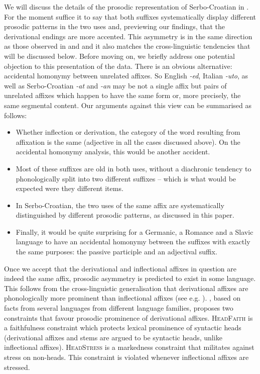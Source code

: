 \documentclass[output=paper]{langsci/langscibook}
\begin{document}
\noindent We will discuss the details of the prosodic representation of Serbo-Croatian in  . For the moment suffice it to say that both suffixes systematically display different prosodic patterns in the two uses and, previewing our findings, that the derivational endings are more accented. This asymmetry is in the same direction as those observed in \citet{Mar2002} and \citet{Arsim2013} and it also matches the cross-linguistic tendencies that will be discussed below.
Before moving on, we briefly address one potential objection to this presentation of the data. There is an obvious alternative: accidental homonymy between unrelated affixes. So English \textit{-ed}, Italian \textit{-uto}, as well as Serbo-Croatian \textit{-at} and \textit{-an} may be not a single affix but pairs of unrelated affixes which happen to have the same form or, more precisely, the same segmental content. Our arguments against this view can be summarised as follows: 
\begin{itemize}
  \item Whether inflection or derivation, the category of the word resulting from affixation is the same (adjective in all the cases discussed above). On the accidental homonymy analysis, this would be another accident.
  \item Most of these suffixes are old in both uses, without a diachronic tendency to phonologically split into two different suffixes – which is what would be expected were they different items. 
  \item In Serbo-Croatian, the two uses of the same affix are systematically distinguished by different prosodic patterns, as discussed in this paper.
  \item Finally, it would be quite surprising for a Germanic, a Romance and a Slavic language to have an accidental homonymy between the suffixes with exactly the same purposes: the passive participle and an adjectival suffix. 
  \end{itemize}
Once we accept that the derivational and inflectional affixes in question are indeed the same affix, prosodic asymmetry is predicted to exist in some language. This follows from the cross-linguistic generalisation that derivational affixes are phonologically more prominent than inflectional affixes (see e.g. \citealt{Bec1997, Revithiadou1999}). \citet{Revithiadou1999}, based on facts from several languages from different language families, proposes two constraints that favour prosodic prominence of derivational affixes. \textsc{HeadFaith} is a faithfulness constraint which protects lexical prominence of syntactic heads (derivational affixes and stems are argued to be syntactic heads, unlike inflectional affixes). \textsc{HeadStress} is a markedness constraint that militates against stress on non-heads. This constraint is violated whenever inflectional affixes are stressed.
\end{document}
